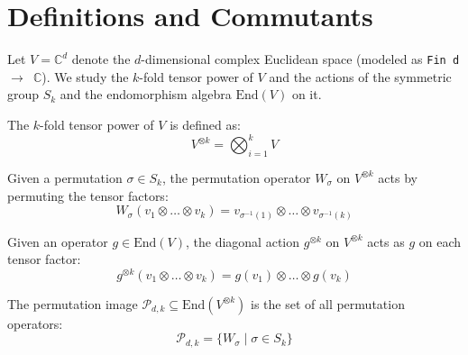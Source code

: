 \section{Definitions and Commutants}

Let $V = \mathbb{C}^d$ denote the $d$-dimensional complex Euclidean space (modeled as \texttt{Fin d $\to$ $\mathbb{C}$}). We study the $k$-fold tensor power of $V$ and the actions of the symmetric group $S_k$ and the endomorphism algebra $\text{End}(V)$ on it.

\begin{definition}\label{def:TensV}
  \leanok
  The $k$-fold tensor power of $V$ is defined as:
  \begin{equation}
    V^{\otimes k} = \bigotimes_{i=1}^k V
  \end{equation}
\end{definition}

\begin{definition}\label{def:permAction}
  \leanok
  Given a permutation $\sigma \in S_k$, the permutation operator $W_\sigma$ on $V^{\otimes k}$ acts by permuting the tensor factors:
  \begin{equation}
    W_\sigma(v_1 \otimes \dots \otimes v_k) = v_{\sigma^{-1}(1)} \otimes \dots \otimes v_{\sigma^{-1}(k)}
  \end{equation}
\end{definition}

\begin{definition}\label{def:diagAction}
  \leanok
  Given an operator $g \in \text{End}(V)$, the diagonal action $g^{\otimes k}$ on $V^{\otimes k}$ acts as $g$ on each tensor factor:
  \begin{equation}
    g^{\otimes k}(v_1 \otimes \dots \otimes v_k) = g(v_1) \otimes \dots \otimes g(v_k)
  \end{equation}
\end{definition}

\begin{definition}\label{def:permImage}
  \leanok
  The permutation image $\mathcal{P}_{d,k} \subseteq \text{End}(V^{\otimes k})$ is the set of all permutation operators:
  \begin{equation}
    \mathcal{P}_{d,k} = \{ W_\sigma \mid \sigma \in S_k \}
  \end{equation}
\end{definition}

